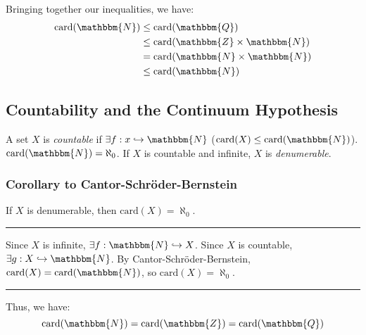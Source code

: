 \documentclass[10pt]{extarticle}
\newcommand{\card}{\text{card}}
\newcommand{\N}{\mathbbm{N}}
\newcommand{\Q}{\mathbbm{Q}}
\newcommand{\Z}{\mathbbm{Z}}
\begin{document}
      Bringing together our inequalities, we have:
      \begin{align*}
        \text{card}(\mathbbm{N}) &\leq \text{card}(\mathbbm{Q})\\
                                &\leq \text{card}(\mathbbm{Z}\times \mathbbm{N})\\
                                &=\text{card}(\mathbbm{N}\times \mathbbm{N})\\
                                &\leq \text{card}(\mathbbm{N})
      \end{align*}
      \subsection{Countability and the Continuum Hypothesis}%
    A set $X$ is \textsl{countable} if $\exists f: x\hookrightarrow \N$ ($\card(X) \leq\card(\N)$). $\card(\N) = \aleph_0$. If $X$ is countable and infinite, $X$ is \textit{denumerable}.
    \subsubsection{Corollary to Cantor-Schröder-Bernstein}%
      If $X$ is denumerable, then $\card(X) = \aleph_0$.\\
      \vspace{4pt}
      \rule{\textwidth}{0.4pt}
      \vspace{4pt}
      Since $X$ is infinite, $\exists f: \N\hookrightarrow X$. Since $X$ is countable, $\exists g: X\hookrightarrow \N$. By Cantor-Schröder-Bernstein, $\card(X) = \card(\N)$, so $\card(X) = \aleph_0$.\\
      \vspace{4pt}
      \rule{\textwidth}{0.4pt}
      \vspace{4pt}
    Thus, we have: 
    \[
      \card(\N) = \card(\Z) = \card(\Q)
    \] 
\end{document}
